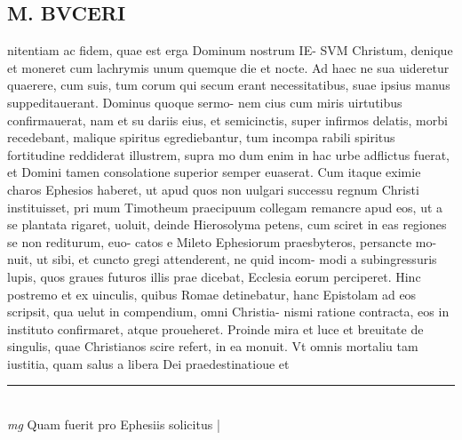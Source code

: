 \documentclass{article}
\begin{document}
\begin{pages}
\section*{M. BVCERI }\pstart nitentiam ac fidem, quae est erga Dominum nostrum IE- SVM Christum, denique et moneret cum lachrymis unum quemque die et nocte. Ad haec ne sua uideretur quaerere, cum suis, tum corum qui secum erant necessitatibus, suae ipsius manus suppeditauerant. Dominus quoque sermo- nem cius cum miris uirtutibus confirmauerat, nam et su dariis eius, et semicinctis, super infirmos delatis, morbi recedebant, malique spiritus egrediebantur, tum incompa rabili spiritus fortitudine reddiderat illustrem, supra mo dum enim in hac urbe adflictus fuerat, et Domini tamen consolatione superior semper euaserat.   \pend\pstart Cum itaque eximie charos Ephesios haberet, ut apud quos non uulgari successu regnum Christi instituisset, pri mum Timotheum praecipuum collegam remancre apud eos, ut a se plantata rigaret, uoluit, deinde Hierosolyma petens, cum sciret in eas regiones se non rediturum, euo- catos e Mileto Ephesiorum praesbyteros, persancte mo- nuit, ut sibi, et cuncto gregi attenderent, ne quid incom- modi a subingressuris lupis, quos graues futuros illis prae dicebat, Ecclesia eorum perciperet. Hinc postremo et ex uinculis, quibus Romae detinebatur, hanc Epistolam ad eos scripsit, qua uelut in compendium, omni Christia- nismi ratione contracta, eos in instituto confirmaret, atque proueheret.  \pend\pstart Proinde mira et luce et breuitate de singulis, quae Christianos scire refert, in ea monuit.  Vt omnis mortaliu tam iustitia, quam salus a libera Dei praedestinatioue et  \pend
\vspace{0.5cm}\noindent
\vspace{0.2cm}\rule{1cm}{0.2pt}\\ 
\hspace{0.2cm}\textit{mg}
\footnotesize Quam fuerit pro Ephesiis solicitus 
\normalsize| 

\end{pages}
\end{document}
